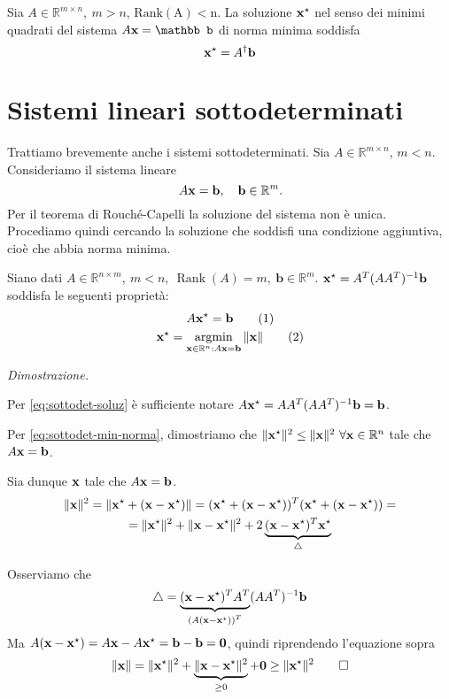 \begin{theorem}
    Sia $A\in \mathbb{R}^{m\times n},\ m>n$, $\operatorname{Rank(A)<n}$. La soluzione $\mathbf{x}^\star$ nel senso dei minimi quadrati del sistema $A\x =\mathbb b$ di norma minima soddisfa
    \[
    \mathbf{x}^\star =A^\dagger\mathbf  b
    \]
\end{theorem}

\section{Sistemi lineari sottodeterminati}

Trattiamo brevemente anche i sistemi sottodeterminati. Sia $A\in \mathbb R^{m\times n}$, $m<n$. Consideriamo il sistema lineare
\[
A\mathbf{x} =\mathbf b,\quad \mathbf b\in \mathbb R^m.
\]
Per il teorema di Rouché-Capelli la soluzione del sistema non è unica. Procediamo quindi cercando la soluzione che soddisfi una condizione aggiuntiva, cioè che abbia norma minima.
\begin{theorem}
    Siano dati $A\in \mathbb R^{n\times m},\ m<n,\ \operatorname{Rank}(A)=m,\ \mathbf b\in \mathbb R^m$. $\mathbf{x}^\star = A^T(AA^T)^{-1}\mathbf b$ soddisfa le seguenti proprietà:
    \begin{gather*}
        A\x^\star =\mathbf b\tag{1}\label{eq:sottodet-soluz}\\
        \x^\star = \operatornamewithlimits{argmin}_{\x \in\mathbb R^n:A\x=\mathbf b} \|\x\| \tag{2}\label{eq:sottodet-min-norma}\\
    \end{gather*}
\end{theorem}

\textit{Dimostrazione.}

Per \eqref{eq:sottodet-soluz} è sufficiente notare $A\mathbf{x}^\star = AA^T (AA^T)^{-1}\mathbf b=\mathbf b$.

Per \eqref{eq:sottodet-min-norma}, dimostriamo che $\|\x^\star\|^2\le \|\x\|^2\ \forall \x\in\mathbb R^n$ tale che $A\mathbf{x} =\mathbf b$.

Sia dunque $\mathbf{x}$ tale che $A\mathbf{x} = \mathbf b$.
\begin{multline*}
    \|\mathbf{x}\|^2=\|\mathbf{x}^\star +(\mathbf{x} -\mathbf{x}^\star)\|=(\mathbf{x}^\star +(\mathbf{x} -\mathbf{x}^\star))^T(\mathbf{x}^\star +(\mathbf{x} -\mathbf{x}^\star))=\\=\|\mathbf{x}^\star \|^2+\|\mathbf{x}-\mathbf{x}^\star\|^2+2\underbrace{(\mathbf{x} -\mathbf{x}^\star)^T\mathbf{x}^\star}_{\triangle}
\end{multline*}

Osserviamo che 
\[
\triangle=\underbrace{(\mathbf{x}-\mathbf{x}^\star)^TA^T}_{\left(A(\mathbf{x}-\mathbf{x}^\star)\right)^T}(AA^T)^{-1}\mathbf b
\]
Ma $A(\mathbf{x}-\mathbf{x}^\star)=A\mathbf{x}-A\mathbf{x}^\star =\mathbf b-\mathbf b=\mathbf 0$, quindi riprendendo l'equazione sopra
\[
\|\mathbf{x}\| = \|\mathbf{x}^\star \|^2+\underbrace{\|\mathbf{x}-\mathbf{x}^\star\|^2}_{\ge 0} + \mathbf 0\ge \|\mathbf{x}^\star \|^2\qed
\]

